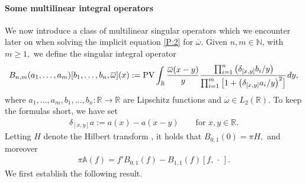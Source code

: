 \documentclass[11pt,reqno]{amsart}
\numberwithin{equation}{section}
\newcommand{\PV}{\mathop{\rm PV}\nolimits}
\newcommand{\0}{\Omega}
\newcommand{\ov}{\overline}
\newcommand{\oo}{\ov\omega}
\newcommand{\bA}{\mathbb{A}}
\newcommand{\R}{\mathbb{R}}
\newcommand{\N}{\mathbb{N}}
\numberwithin{equation}{section}
\begin{document}
\paragraph{\bf Some  multilinear   integral operators}
We now introduce a class of multilinear singular  operators which we encounter  later on when solving the implicit equation \eqref{P:2} for $\oo$.
Given $n,m\in\N$, with $m\geq1, $   we define the  singular integral operator 
\[
B_{n,m}(a_1,\ldots, a_{ m})[b_1,\ldots, b_n,\oo](x):=\PV\int_\R  \frac{\oo(x-y)}{y}\cfrac{\prod_{i=1}^{n}\big(\delta_{[x,y]} b_i /y\big)}{\prod_{i=1}^{m}\big[1+\big(\delta_{[x,y]}  a_i /y\big)^2\big]}\, dy,
\]
where   $a_1,\ldots, a_{m},b_1,\ldots, b_n:\R\to\R$  are Lipschitz functions and $\oo\in L_2(\R)$.
To keep the formulas short, we have set
 \begin{align*}
   \delta_{[x,y]}a:=a(x)-a(x-y)  \qquad \text{for  $x,y\in\R.$} 
 \end{align*}
 Letting $H$ denote the Hilbert transform \cite{St93}, it holds that $B_{0,1}(0)=\pi H,$ and moreover
 \begin{align}\label{FOF}
 \pi\bA(f)=f'B_{0,1}(f)-B_{1,1}(f)[f,\,\cdot\,].
 \end{align}
 We first establish the following result.
 
\end{document}
